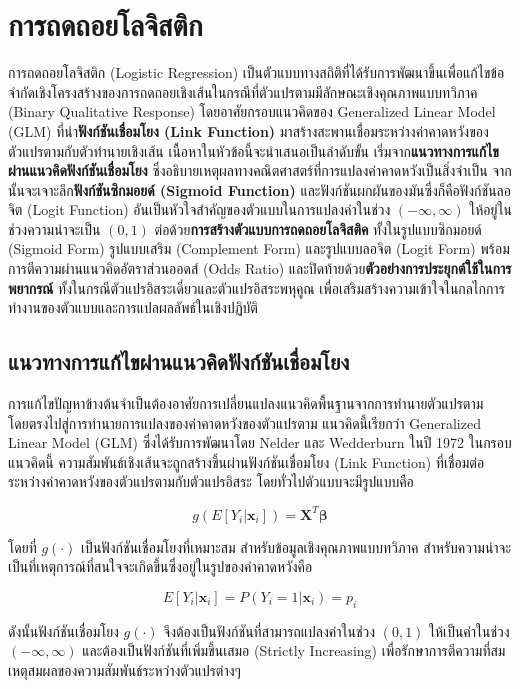 \section{การถดถอยโลจิสติก}
การถดถอยโลจิสติก (Logistic Regression) เป็นตัวแบบทางสถิติที่ได้รับการพัฒนาขึ้นเพื่อแก้ไขข้อจำกัดเชิงโครงสร้างของการถดถอยเชิงเส้นในกรณีที่ตัวแปรตามมีลักษณะเชิงคุณภาพแบบทวิภาค (Binary Qualitative Response) โดยอาศัยกรอบแนวคิดของ Generalized Linear Model (GLM) ที่นำ\textbf{ฟังก์ชันเชื่อมโยง (Link Function)} มาสร้างสะพานเชื่อมระหว่างค่าคาดหวังของตัวแปรตามกับตัวทำนายเชิงเส้น เนื้อหาในหัวข้อนี้จะนำเสนอเป็นลำดับขั้น เริ่มจาก\textbf{แนวทางการแก้ไขผ่านแนวคิดฟังก์ชันเชื่อมโยง} ซึ่งอธิบายเหตุผลทางคณิตศาสตร์ที่การแปลงค่าคาดหวังเป็นสิ่งจำเป็น จากนั้นจะเจาะลึก\textbf{ฟังก์ชันซิกมอยด์ (Sigmoid Function)} และฟังก์ชันผกผันของมันซึ่งก็คือฟังก์ชันลอจิต (Logit Function) อันเป็นหัวใจสำคัญของตัวแบบในการแปลงค่าในช่วง $(-\infty, \infty)$ ให้อยู่ในช่วงความน่าจะเป็น $(0, 1)$ ต่อด้วย\textbf{การสร้างตัวแบบการถดถอยโลจิสติค} ทั้งในรูปแบบซิกมอยด์ (Sigmoid Form) รูปแบบเสริม (Complement Form) และรูปแบบลอจิต (Logit Form) พร้อมการตีความผ่านแนวคิดอัตราส่วนออดส์ (Odds Ratio) และปิดท้ายด้วย\textbf{ตัวอย่างการประยุกต์ใช้ในการพยากรณ์} ทั้งในกรณีตัวแปรอิสระเดี่ยวและตัวแปรอิสระพหุคูณ เพื่อเสริมสร้างความเข้าใจในกลไกการทำงานของตัวแบบและการแปลผลลัพธ์ในเชิงปฏิบัติ

\subsection{แนวทางการแก้ไขผ่านแนวคิดฟังก์ชันเชื่อมโยง}

การแก้ไขปัญหาข้างต้นจำเป็นต้องอาศัยการเปลี่ยนแปลงแนวคิดพื้นฐานจากการทำนายตัวแปรตามโดยตรงไปสู่การทำนายการแปลงของค่าคาดหวังของตัวแปรตาม แนวคิดนี้เรียกว่า Generalized Linear Model (GLM) ซึ่งได้รับการพัฒนาโดย Nelder และ Wedderburn ในปี 1972 ในกรอบแนวคิดนี้ ความสัมพันธ์เชิงเส้นจะถูกสร้างขึ้นผ่านฟังก์ชันเชื่อมโยง (Link Function) ที่เชื่อมต่อระหว่างค่าคาดหวังของตัวแปรตามกับตัวแปรอิสระ โดยทั่วไปตัวแบบจะมีรูปแบบคือ 

$$g(E[Y_i|\mathbf{x}_i]) = \mathbf{X}^{T} \boldsymbol{\beta}$$

\noindent
โดยที่ $g(\cdot)$ เป็นฟังก์ชันเชื่อมโยงที่เหมาะสม สำหรับข้อมูลเชิงคุณภาพแบบทวิภาค สำหรับความน่าจะเป็นที่เหตุการณ์ที่สนใจจะเกิดขึ้นซึ่งอยู่ในรูปของค่าคาดหวังคือ  

$$E[Y_i|\mathbf{x}_i] = P(Y_i = 1|\mathbf{x}_i) = p_i$$ 

ดังนั้นฟังก์ชันเชื่อมโยง $g(\cdot)$ จึงต้องเป็นฟังก์ชันที่สามารถแปลงค่าในช่วง $(0, 1)$ ให้เป็นค่าในช่วง $(-\infty, \infty)$ และต้องเป็นฟังก์ชันที่เพิ่มขึ้นเสมอ (Strictly Increasing) เพื่อรักษาการตีความที่สมเหตุสมผลของความสัมพันธ์ระหว่างตัวแปรต่างๆ

